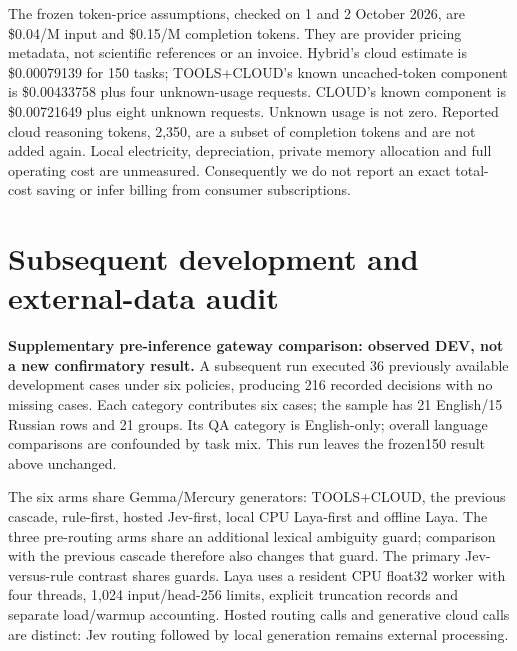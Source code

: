 \documentclass[10pt,a4paper,twocolumn]{article}
\begin{document}
The frozen token-price assumptions, checked on 1 and 2 October 2026, are \$0.04/M input and \$0.15/M completion tokens. They are provider pricing metadata, not scientific references or an invoice. Hybrid's cloud estimate is \$0.00079139 for 150 tasks; TOOLS+CLOUD's known uncached-token component is \$0.00433758 plus four unknown-usage requests. CLOUD's known component is \$0.00721649 plus eight unknown requests. Unknown usage is not zero. Reported cloud reasoning tokens, 2,350, are a subset of completion tokens and are not added again. Local electricity, depreciation, private memory allocation and full operating cost are unmeasured. Consequently we do not report an exact total-cost saving or infer billing from consumer subscriptions.

\section{Subsequent development and external-data audit}

\textbf{Supplementary pre-inference gateway comparison: observed DEV, not a new confirmatory result.} A subsequent run executed 36 previously available development cases under six policies, producing 216 recorded decisions with no missing cases. Each category contributes six cases; the sample has 21 English/15 Russian rows and 21 groups. Its QA category is English-only; overall language comparisons are confounded by task mix. This run leaves the frozen150 result above unchanged.

The six arms share Gemma/Mercury generators: TOOLS+CLOUD, the previous cascade, rule-first, hosted Jev-first, local CPU Laya-first and offline Laya. The three pre-routing arms share an additional lexical ambiguity guard; comparison with the previous cascade therefore also changes that guard. The primary Jev-versus-rule contrast shares guards. Laya uses a resident CPU float32 worker with four threads, 1,024 input/head-256 limits, explicit truncation records and separate load/warmup accounting. Hosted routing calls and generative cloud calls are distinct: Jev routing followed by local generation remains external processing.
\end{document}
